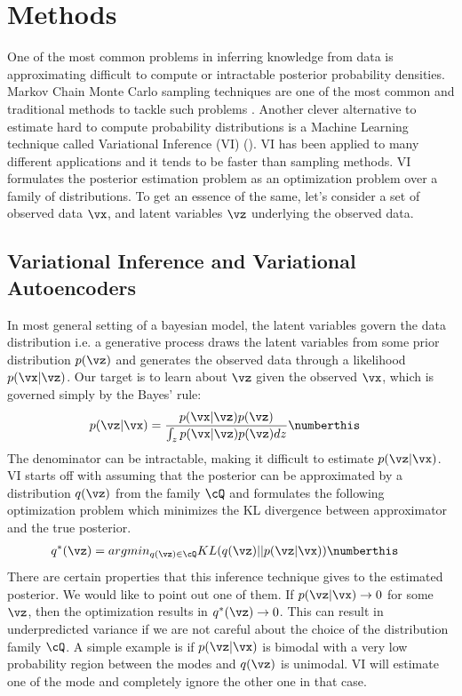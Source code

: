 \section{Methods}
One of the most common problems in inferring knowledge from data is approximating difficult to compute or intractable posterior probability densities. Markov Chain Monte Carlo sampling techniques are one of the most common and traditional methods to tackle such problems \cite{Hastings1970}. Another clever alternative to estimate hard to compute probability distributions is a Machine Learning technique called Variational Inference (VI) (\cite{Hoffman2013}). VI has been applied to many different applications and it tends to be faster than sampling methods. VI formulates the posterior estimation problem as an optimization problem over a family of distributions. To get an essence of the same, let's consider a set of observed data $\vx$, and latent variables $\vz$ underlying the observed data. 

\subsection{Variational Inference and Variational Autoencoders}

In most general setting of a bayesian model, the latent variables govern the data distribution i.e. a generative process draws the latent variables from some prior distribution $p(\vz)$ and generates the observed data through a likelihood $p(\vx|\vz)$. Our target is to learn about $\vz$ given the observed $\vx$, which is governed simply by the Bayes' rule:
\begin{align*}
 p( \vz | \vx)&= \frac{p(\vx|\vz)p(\vz)}{\int_z p(\vx|\vz)p(\vz) dz} \numberthis \label{bayes-rule}
\end{align*}
The denominator can be intractable, making it difficult to estimate $p( \vz | \vx)$.  VI starts off with assuming that the posterior can be approximated by a distribution $q(\vz)$ from the family $\cQ$ and formulates the following optimization problem which minimizes the KL divergence between approximator and the true posterior. 
\begin{align*}
 q^*(\vz) &= argmin_{q(\vz)\in\cQ} KL(q(\vz)||p(\vz|\vx)) \numberthis \label{vi-formulation}
\end{align*}
There are certain properties that this inference technique gives to the estimated posterior. We would like to point out one of them. If $p(\vz|\vx) \rightarrow 0 $ for some $\vz$, then the optimization results in $q^*(\vz) \rightarrow 0$. This can result in underpredicted variance if we are not careful about the choice of the distribution family $\cQ$. A simple example is if $p(\vz|\vx)$ is bimodal with a very low probability region between the modes and $q(\vz)$ is unimodal. VI will estimate one of the mode and  completely ignore the other one in that case.

